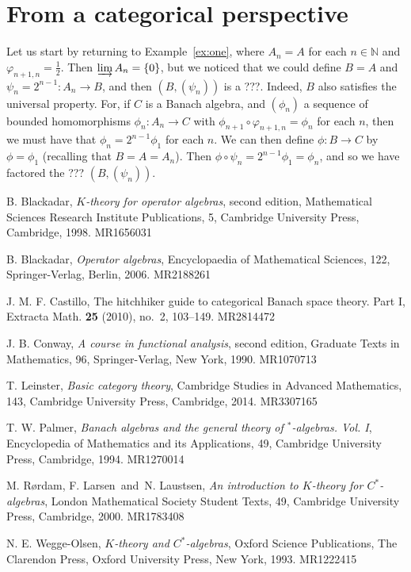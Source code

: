 \documentclass[a4paper,11pt]{article}
\newcommand{\indlim}{\varinjlim}
\theoremstyle{definition}
\begin{document}
\section{From a categorical perspective}

Let us start by returning to Example~\ref{ex:one}, where $A_n=A$ for each $n\in\mathbb N$ and
$\varphi_{n+1,n} = \frac12$.  Then $\indlim A_n = \{0\}$, but we noticed that we could define $B=A$
and $\psi_n = 2^{n-1}:A_n\rightarrow B$, and then $(B,(\psi_n))$ is a ???.  Indeed, $B$ also
satisfies the universal property.  For, if $C$ is a Banach algebra, and $(\phi_n)$ a sequence of
bounded homomorphisms $\phi_n:A_n\rightarrow C$ with $\phi_{n+1} \circ \varphi_{n+1,n} = \phi_n$ for
each $n$, then we must have that $\phi_n = 2^{n-1} \phi_1$ for each $n$.  We can then define $\phi:
B\rightarrow C$ by $\phi = \phi_1$ (recalling that $B=A=A_n$).  Then $\phi\circ\psi_n = 2^{n-1}\phi_1
= \phi_n$, and so we have factored the ??? $(B,(\psi_n))$.






\begin{thebibliography}{99}

 B. Blackadar, {\it $K$-theory for operator algebras}, second edition, Mathematical Sciences Research Institute Publications, 5, Cambridge University Press, Cambridge, 1998. MR1656031

 B. Blackadar, {\it Operator algebras}, Encyclopaedia of Mathematical Sciences, 122, Springer-Verlag, Berlin, 2006. MR2188261

 J. M. F. Castillo, The hitchhiker guide to categorical Banach space theory. Part I, Extracta Math. {\bf 25} (2010), no.~2, 103--149. MR2814472

 J. B. Conway, {\it A course in functional analysis}, second edition, Graduate Texts in Mathematics, 96, Springer-Verlag, New York, 1990. MR1070713

 T. Leinster, {\it Basic category theory}, Cambridge Studies in Advanced Mathematics, 143, Cambridge University Press, Cambridge, 2014. MR3307165

 T. W. Palmer, {\it Banach algebras and the general theory of $^*$-algebras. Vol. I}, Encyclopedia of Mathematics and its Applications, 49, Cambridge University Press, Cambridge, 1994. MR1270014

 M. R\o rdam, F. Larsen\ and\ N. Laustsen, {\it An introduction to $K$-theory for $C^*$-algebras}, London Mathematical Society Student Texts, 49, Cambridge University Press, Cambridge, 2000. MR1783408

 N. E. Wegge-Olsen, {\it $K$-theory and $C^*$-algebras}, Oxford Science Publications, The Clarendon Press, Oxford University Press, New York, 1993. MR1222415

\end{thebibliography}
\end{document}

